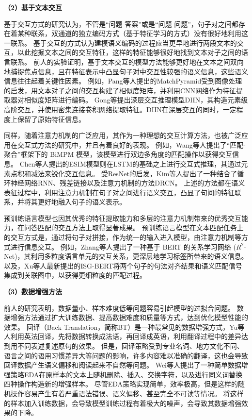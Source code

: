 \textbf{\songti （2）基于文本交互}
 
基于交互方式的研究认为，不管是“问题-答案”或是“问题-问题”，句子对之间都存在着某种联系，双通道的独立编码方式（基于特征学习的方式）没有很好地利用这一联系。
基于交互的方式认为建模语义编码的过程应当更早地进行两段文本的交互，以此挖掘文本之间的交互特征，这样的特征能够很好地找到文本对子之间的语言联系。
前人的实验证明，基于文本交互的模型方法能够更好地在文本之间双向地捕捉焦点信息，且在特征表示中凸显句子对中交互性较强的语义信息，这些语义信息往往起着关键性因素。
例如，Pang等人提出的MatchPyramid\cite{pang2016text}受到图像处理的启发，用文本对子之间的交互构建了相似度矩阵，并利用CNN网络作为特征提取器对相似度矩阵进行编码。
Gong等提出深层交互推理模型DIIN\cite{gong2017natural}，其构造元素级高阶交互，并使用密集连接卷积网络提取特征。DIIN在深层交互的同时，一定程度上保留了原始特征信息。

同样，随着注意力机制的广泛应用，其作为一种理想的交互计算方法，也被广泛应用在交互式方法的研究中，并且有着良好的表现。
例如，Wang等人提出了“匹配-聚合”框架下的 BiMPM 模型\cite{wang2017bilateral}，该模型进行双边多角度的匹配操作以获得交互信息。 
Chen等人提出的ESIM\citet{chen-etal-2017-enhanced}模型则在LSTM的基础之上进行交互式推理，其通过元素点积和减法来锐化交互信息。
受ResNet\cite{he2016deep}的启发，Kim等人提出了一种结合了循环神经网络RNN、残差链接以及注意力机制的方法DRCN\cite{kim2019semantic}。
上述的方法都在语义表征过程中，利用注意力机制在句子对之间进行语义交互，凸显了句间的特征联系，并将其更好地融入句子的语义表示。

预训练语言模型也因其优秀的特征提取能力和多层的注意力机制带来的优秀交互能力，在问答匹配的交互方法上取得显著成果。
预训练语言模型在文本匹配任务上的交互方式是，通过将句子对拼接，作为统一的输入进入模型，由注意力机制等方式进行信息交互。
例如，Zhang等人提出了一种基于 BERT 的关系学习网络 ($R^2$-Net)\cite{zhang2021making}，其利用多粒度语言单元的交互关系，更深层地学习标签所带来的语义信息。
以及，Xu等人最新提出的ISG-BERT\cite{xu2022semantic}将两个句子的句法对齐结果和语义匹配信号集成到关联图中，以获得更细粒度的匹配过程。

\textbf{\songti （3）数据增强方法}

前人的研究表明，数据量小、样本难度低等问题容易引起模型的过拟合问题。
数据增强方法通过扩大训练数据、提高数据难度和质量等方式，达到优化模型性能的效果。
回译（Back Translation，简称BT）是一种最常见的数据增强方式，Yu等人\cite{yu2018qanet}利用英法回译，先将数据转换成法语，再回译成英语，利用翻译过程中的差异达到用不同表述复述原句的效果。
但是，回译策略受到专业名词、地方文化不同、语言之间的语用习惯差异大等问题的影响，许多内容难以准确的翻译，这也会导致回译数据产生语义偏移和阅读起来不自然等问题。
Wei等人提出了一种简单数据增强策略EDA\cite{wei2019eda}在原样本的文本上随机删除、插入、交换字符，以及进行同义词替换四种操作构造新的增强样本。
尽管EDA策略实现简单，效率极高，但是这样的随机操作容易产生有着严重语法错误、语义偏移、甚至完全不可读等情况。
将这样的样本加入训练数据，会导致模型训练过程有着极大的噪声，会导致其数据增强效果的下降。

